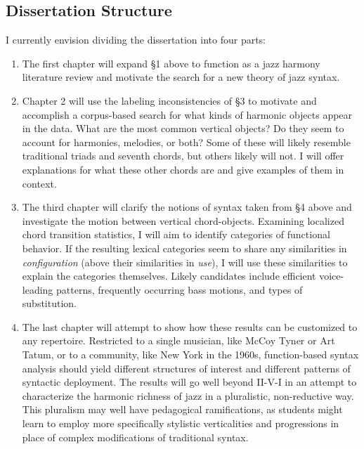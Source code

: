 \subsection{Dissertation Structure}
I currently envision dividing the dissertation into four parts:
\begin{enumerate}
	\item The first chapter will expand \S 1 above to function as a jazz harmony literature review and motivate the search for a new theory of jazz syntax.
	\item Chapter 2 will use the labeling inconsistencies of \S 3 to motivate and accomplish a corpus-based search for what kinds of harmonic objects appear in the data.  What are the most common vertical objects? Do they seem to account for harmonies, melodies, or both?  Some of these will likely resemble traditional triads and seventh chords, but others likely will not.  I will offer explanations for what these other chords are and give examples of them in context.
	\item The third chapter will clarify the notions of syntax taken from \S 4 above and investigate the motion between vertical chord-objects.  Examining localized chord transition statistics, I will aim to identify categories of functional behavior.  If the resulting lexical categories seem to share any similarities in \emph{configuration} (above their similarities in \emph{use}), I will use these similarities to explain the categories themselves.  Likely candidates include efficient voice-leading patterns, frequently occurring bass motions, and types of substitution.
	\item The last chapter will attempt to show how these results can be customized to any repertoire.  Restricted to a single musician, like McCoy Tyner or Art Tatum, or to a community, like New York in the 1960s, function-based syntax analysis should yield different structures of interest and different patterns of syntactic deployment.  The results will go well beyond II-V-I in an attempt to characterize the harmonic richness of jazz in a pluralistic, non-reductive way.  This pluralism may well have pedagogical ramifications, as students might learn to employ more specifically stylistic verticalities and progressions in place of complex modifications of traditional syntax.
\end{enumerate}
